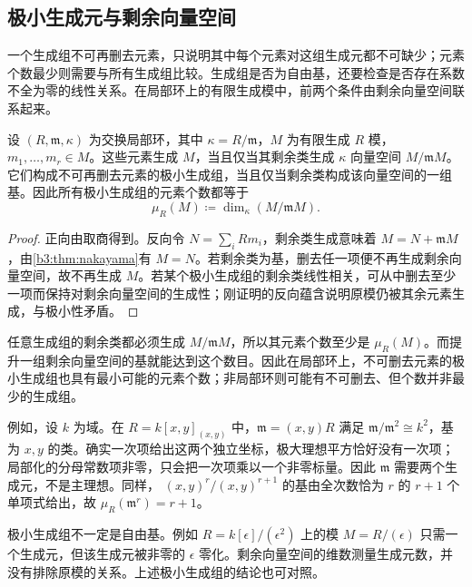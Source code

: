 \subsection{极小生成元与剩余向量空间}
\label{b3:subsec:0302:03}

一个生成组不可再删去元素，只说明其中每个元素对这组生成元都不可缺少；元素个数最少则需要与所有生成组比较。生成组是否为自由基，还要检查是否存在系数不全为零的线性关系。在局部环上的有限生成模中，前两个条件由剩余向量空间联系起来。

\begin{corollary}\label{b3:cor:local-generators}
	设 \((R,\mathfrak m,\kappa)\) 为交换局部环，其中 \(\kappa=R/\mathfrak m\)，\(M\) 为有限生成 \(R\) 模，\(m_1,\ldots,m_r\in M\)。这些元素生成 \(M\)，当且仅当其剩余类生成 \(\kappa\) 向量空间 \(M/\mathfrak mM\)。它们构成不可再删去元素的极小生成组，当且仅当剩余类构成该向量空间的一组基。因此所有极小生成组的元素个数都等于
	\[
		\mu_R(M)\coloneqq\dim_\kappa(M/\mathfrak mM).
	\]
\end{corollary}
\begin{proof}
	正向由取商得到。反向令 \(N=\sum_i Rm_i\)，剩余类生成意味着 \(M=N+\mathfrak mM\)，由\cref{b3:thm:nakayama}有 \(M=N\)。若剩余类为基，删去任一项便不再生成剩余向量空间，故不再生成 \(M\)。若某个极小生成组的剩余类线性相关，可从中删去至少一项而保持对剩余向量空间的生成性；刚证明的反向蕴含说明原模仍被其余元素生成，与极小性矛盾。
\end{proof}

任意生成组的剩余类都必须生成 \(M/\mathfrak mM\)，所以其元素个数至少是 \(\mu_R(M)\)。而提升一组剩余向量空间的基就能达到这个数目。因此在局部环上，不可删去元素的极小生成组也具有最小可能的元素个数；非局部环则可能有不可删去、但个数并非最少的生成组。

\ProseParagraphBreak
例如，设 \(k\) 为域。在 \(R=k[x,y]_{(x,y)}\) 中，\(\mathfrak m=(x,y)R\) 满足 \(\mathfrak m/\mathfrak m^2\cong k^2\)，基为 \(x,y\) 的类。确实一次项给出这两个独立坐标，极大理想平方恰好没有一次项；局部化的分母常数项非零，只会把一次项乘以一个非零标量。因此 \(\mathfrak m\) 需要两个生成元，不是主理想。同样， \((x,y)^r/(x,y)^{r+1}\) 的基由全次数恰为 \(r\) 的 \(r+1\) 个单项式给出，故 \(\mu_R(\mathfrak m^r)=r+1\)。

\ProseParagraphBreak
极小生成组不一定是自由基。例如 \(R=k[\epsilon]/(\epsilon^2)\) 上的模 \(M=R/(\epsilon)\) 只需一个生成元，但该生成元被非零的 \(\epsilon\) 零化。剩余向量空间的维数测量生成元数，并没有排除原模的关系。上述极小生成组的结论也可对照\cite[Theorem 2.3, pp. 8--9]{Matsumura1989CommutativeRingTheory}。

